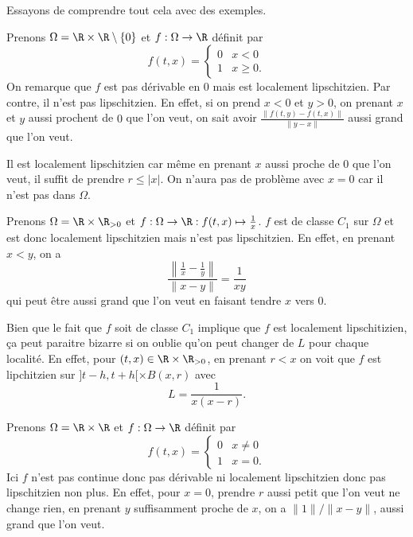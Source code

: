 Essayons de comprendre tout cela avec des exemples.
\begin{myexem}
  \label{ex:ux}
  Prenons $\Omega = \R\times\R\setminus\{0\}$ et $f:\Omega\to\R$ définit par
  \[
    f(t,x) =
    \begin{cases}
      0 & x < 0\\
      1 & x \geq 0.
    \end{cases}
  \]
  On remarque que $f$ est pas dérivable en $0$ mais est localement
  lipschitzien.
  Par contre, il n'est pas lipschitzien.
  En effet, si on prend $x < 0$ et $y > 0$, on prenant $x$ et $y$ aussi
  prochent de $0$ que l'on veut,
  on sait avoir $\frac{\|f(t,y)-f(t,x)\|}{\|y-x\|}$
  aussi grand que l'on veut.

  Il est localement lipschitzien car même en prenant $x$
  aussi proche de $0$ que l'on veut,
  il suffit de prendre $r \leq |x|$.
  On n'aura pas de problème avec $x = 0$ car il n'est pas dans $\Omega$.
\end{myexem}
\begin{myexem}
  \label{ex:harm}
  Prenons $\Omega = \R\times\R_{>0}$ et
  $f:\Omega\to\R:f(t,x)\mapsto \frac{1}{x}$.
  $f$ est de classe $C_1$ sur $\Omega$ et est donc localement lipschitzien
  mais n'est pas lipschitzien.
  En effet, en prenant $x < y$, on a
  \[ \frac{\left\|\frac{1}{x}-\frac{1}{y}\right\|}{\|x-y\|} = \frac{1}{xy} \]
  qui peut être aussi grand que l'on veut en faisant tendre $x$ vers 0.

  Bien que le fait que $f$ soit de classe $C_1$ implique que $f$ est
  localement lipschitizien,
  ça peut paraitre bizarre si on oublie qu'on peut changer de $L$ pour
  chaque localité.
  En effet, pour $(t,x) \in \R\times\R_{>0}$,
  en prenant $r < x$
  on voit que $f$ est lipchitzien sur $]t-h,t+h[ \times B(x,r)$
  avec
  \[ L = \frac{1}{x(x-r)}. \]
\end{myexem}
\begin{myexem}
  Prenons $\Omega = \R\times\R$ et $f:\Omega\to\R$ définit par
  \[
    f(t,x) =
    \begin{cases}
      0 & x \neq 0\\
      1 & x = 0.
    \end{cases}
  \]
  Ici $f$ n'est pas continue donc pas dérivable ni localement lipschitzien
  donc pas lipschitzien non plus.
  En effet, pour $x = 0$, prendre $r$ aussi petit que l'on veut ne change rien,
  en prenant $y$ suffisamment proche de $x$, on a $\|1\|/\|x-y\|$,
  aussi grand que l'on veut.
\end{myexem}
